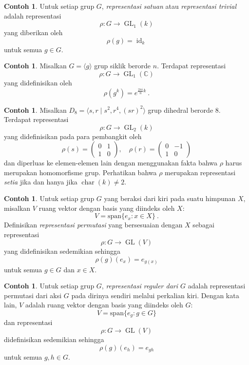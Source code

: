 \documentclass[12pt]{article}
\theoremstyle{plain}
\theoremstyle{definition}
\newtheorem{example}[theorem]{Contoh}
\theoremstyle{remark}
\numberwithin{equation}{section}
\begin{document}
\begin{example}
Untuk setiap grup $G$,
\emph{representasi satuan} atau \emph{representasi trivial} adalah representasi
\[ \rho: G \to \operatorname{GL}_1(k) \]
yang diberikan oleh
\[
\rho(g)=\operatorname{id}_k
\]
untuk semua $g \in G$.
\end{example}

\begin{example}
Misalkan $G = \langle g \rangle$ grup siklik berorde $n$.
Terdapat representasi
\[ \rho : G \to \operatorname{GL}_1(\mathbb{C}) \]
yang didefinisikan oleh
\[
\rho(g^k)=e^{\frac{2\pi i}{n}k} \ .
\]
\end{example}

\begin{example}
Misalkan $D_8 = \langle s,r \mid s^2, r^4, (sr)^2 \rangle$
grup dihedral berorde $8$.
Terdapat representasi
\[ \rho : G \to \operatorname{GL}_2(k) \]
yang didefinisikan pada para pembangkit oleh
\[
\rho(s)=\begin{pmatrix} 0&1\\1&0 \end{pmatrix} ,\quad
\rho(r)=\begin{pmatrix} 0&-1\\1&0 \end{pmatrix}
\]
dan diperluas ke elemen-elemen lain dengan menggunakan fakta bahwa $\rho$
harus merupakan homomorfisme grup.
Perhatikan bahwa $\rho$ merupakan representasi \emph{setia} jika dan hanya jika
$\operatorname{char}(k) \ne 2$.
\end{example}


\begin{example}
Untuk setiap grup $G$ yang beraksi dari kiri pada suatu himpunan $X$,
misalkan $V$ ruang vektor dengan basis yang diindeks oleh $X$:
\[
V = \mathrm{span} \{ e_x : x \in X \} \ .
\]
Definisikan \emph{representasi permutasi} yang bersesuaian dengan $X$
sebagai representasi
\[
\rho : G \to \operatorname{GL}(V)
\]
yang didefinisikan sedemikian sehingga
\[
\rho(g)(e_x) = e_{g(x)}
\]
untuk semua $g \in G$ dan $x \in X$.
\end{example}

\begin{example}
Untuk setiap grup $G$, \emph{representasi reguler dari $G$}
adalah representasi permutasi dari aksi $G$ pada dirinya sendiri melalui
perkalian kiri.
Dengan kata lain, 
$V$ adalah ruang vektor dengan basis yang diindeks oleh $G$:
\[
V = \mathrm{span} \{ e_g : g \in G \}
\]
dan representasi
\[
\rho : G \to \operatorname{GL}(V)
\]
didefinisikan sedemikian sehingga
\[
\rho(g)(e_h) = e_{gh}
\]
untuk semua $g,h \in G$.
\end{example}
\end{document}
